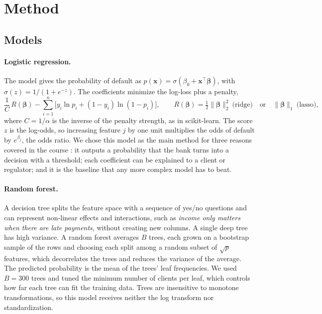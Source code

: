 \section{Method}
\label{sec:method}

\subsection{Models}
\label{sec:models}
\paragraph{Logistic regression.} The model gives the probability of default
as $p(\mathbf{x}) = \sigma(\beta_0 + \mathbf{x}^\top\boldsymbol{\beta})$, with
$\sigma(z) = 1/(1+e^{-z})$. The coefficients minimize the log-loss plus a
penalty,
\begin{equation}
  \frac{1}{C}\,R(\boldsymbol{\beta})
  - \sum_{i=1}^{n}\Big[y_i \ln p_i + (1-y_i)\ln(1-p_i)\Big],
  \qquad
  R(\boldsymbol{\beta}) = \tfrac{1}{2}\lVert\boldsymbol{\beta}\rVert_2^2
  \ \text{(ridge)} \quad\text{or}\quad
  \lVert\boldsymbol{\beta}\rVert_1 \ \text{(lasso)},
  \label{eq:logloss}
\end{equation}
where $C = 1/\alpha$ is the inverse of the penalty strength, as in
scikit-learn. The score $z$ is the log-odds, so increasing feature $j$ by one
unit multiplies the odds of default by $e^{\beta_j}$, the odds ratio. We chose
this model as the main method for three reasons covered in the course
\citep{oku2026slides,james2021islr,izbicki2020aprendizado}: it outputs a probability that the bank
turns into a decision with a threshold; each coefficient can be explained to a
client or regulator; and it is the baseline that any more complex model has
to beat.

\paragraph{Random forest.} A decision tree splits the feature space with a
sequence of yes/no questions and can represent non-linear effects and
interactions, such as \emph{income only matters when there are late payments},
without creating new columns. A single deep tree has high variance. A random
forest \citep{breiman2001random,hastie2009esl} averages $B$ trees, each grown
on a bootstrap sample of the rows and choosing each split among a random
subset of $\sqrt{p}$ features, which decorrelates the trees and reduces the
variance of the average. The predicted probability is the mean of the trees'
leaf frequencies. We used $B = 300$ trees and tuned the minimum number of
clients per leaf, which controls how far each tree can fit the training data.
Trees are insensitive to monotone transformations, so this model receives
neither the log transform nor standardization.

